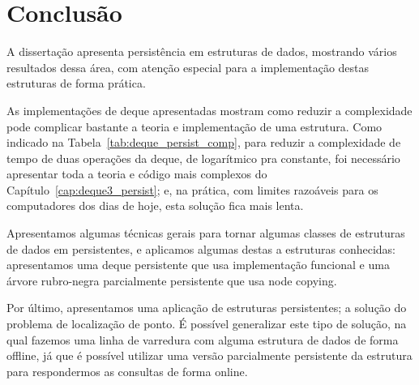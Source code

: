 \documentclass[main.tex]{subfiles}
\begin{document}
\setcounter{secnumdepth}{0}

\chapter*{Conclusão}

A dissertação apresenta persistência em estruturas de dados, mostrando vários resultados dessa área, com atenção especial para a implementação destas estruturas de forma prática.

As implementações de deque apresentadas mostram como reduzir a complexidade pode complicar bastante a teoria e implementação de uma estrutura. Como indicado na Tabela~\ref{tab:deque_persist_comp}, para reduzir a complexidade de tempo de duas operações da deque, de logarítmico pra constante, foi necessário apresentar toda a teoria e código mais complexos do Capítulo~\ref{cap:deque3_persist}; e, na prática, com limites razoáveis para os computadores dos dias de hoje, esta solução fica mais lenta.

Apresentamos algumas técnicas gerais para tornar algumas classes de estruturas de dados em persistentes, e aplicamos algumas destas a estruturas conhecidas: apresentamos uma deque persistente que usa implementação funcional e uma árvore rubro-negra parcialmente persistente que usa node copying.

Por último, apresentamos uma aplicação de estruturas persistentes; a solução do problema de localização de ponto. É possível generalizar este tipo de solução, na qual fazemos uma linha de varredura com alguma estrutura de dados de forma offline, já que é possível utilizar uma versão parcialmente persistente da estrutura para respondermos as consultas de forma online.

\setcounter{secnumdepth}{1}
\end{document}
